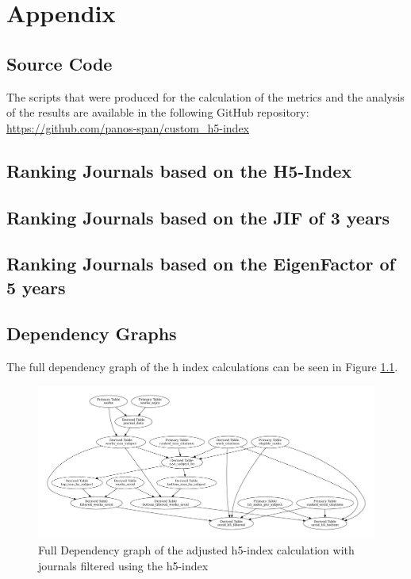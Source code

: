 \chapter{Appendix}
\label{ch:appendix}

\section{Source Code}

The scripts that were produced for the calculation of the metrics and the
analysis of the results are available in the following GitHub repository:
\url{
    https://github.com/panos-span/custom_h5-index
}

\section{Ranking Journals based on the H5-Index}



\section{Ranking Journals based on the JIF of 3 years}

\section{Ranking Journals based on the EigenFactor of 5 years}



\section{Dependency Graphs}
The full dependency graph of the h index calculations can be seen
in Figure \ref{fig:dependency_graph_h5}.

\begin{figure}[H]
    \centering
    \includegraphics[width=\textwidth]{../figs/full-graph_h5.pdf}
    \caption{Full Dependency graph of the adjusted h5-index calculation with journals filtered using the h5-index}
    \label{fig:dependency_graph_h5}
\end{figure}

